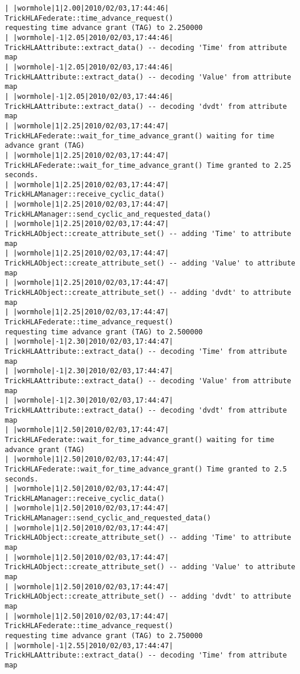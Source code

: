 \begin{lstlisting}[numbers=none,caption={output showing conditionally sent cyclic data}]
| |wormhole|1|2.00|2010/02/03,17:44:46| TrickHLAFederate::time_advance_request()   
requesting time advance grant (TAG) to 2.250000
| |wormhole|-1|2.05|2010/02/03,17:44:46| TrickHLAAttribute::extract_data() -- decoding 'Time' from attribute map
| |wormhole|-1|2.05|2010/02/03,17:44:46| TrickHLAAttribute::extract_data() -- decoding 'Value' from attribute map
| |wormhole|-1|2.05|2010/02/03,17:44:46| TrickHLAAttribute::extract_data() -- decoding 'dvdt' from attribute map
| |wormhole|1|2.25|2010/02/03,17:44:47| TrickHLAFederate::wait_for_time_advance_grant() waiting for time advance grant (TAG)
| |wormhole|1|2.25|2010/02/03,17:44:47| TrickHLAFederate::wait_for_time_advance_grant() Time granted to 2.25 seconds.
| |wormhole|1|2.25|2010/02/03,17:44:47| TrickHLAManager::receive_cyclic_data()
| |wormhole|1|2.25|2010/02/03,17:44:47| TrickHLAManager::send_cyclic_and_requested_data()
| |wormhole|1|2.25|2010/02/03,17:44:47| TrickHLAObject::create_attribute_set() -- adding 'Time' to attribute map
| |wormhole|1|2.25|2010/02/03,17:44:47| TrickHLAObject::create_attribute_set() -- adding 'Value' to attribute map
| |wormhole|1|2.25|2010/02/03,17:44:47| TrickHLAObject::create_attribute_set() -- adding 'dvdt' to attribute map
| |wormhole|1|2.25|2010/02/03,17:44:47| TrickHLAFederate::time_advance_request()   
requesting time advance grant (TAG) to 2.500000
| |wormhole|-1|2.30|2010/02/03,17:44:47| TrickHLAAttribute::extract_data() -- decoding 'Time' from attribute map
| |wormhole|-1|2.30|2010/02/03,17:44:47| TrickHLAAttribute::extract_data() -- decoding 'Value' from attribute map
| |wormhole|-1|2.30|2010/02/03,17:44:47| TrickHLAAttribute::extract_data() -- decoding 'dvdt' from attribute map
| |wormhole|1|2.50|2010/02/03,17:44:47| TrickHLAFederate::wait_for_time_advance_grant() waiting for time advance grant (TAG)
| |wormhole|1|2.50|2010/02/03,17:44:47| TrickHLAFederate::wait_for_time_advance_grant() Time granted to 2.5 seconds.
| |wormhole|1|2.50|2010/02/03,17:44:47| TrickHLAManager::receive_cyclic_data()
| |wormhole|1|2.50|2010/02/03,17:44:47| TrickHLAManager::send_cyclic_and_requested_data()
| |wormhole|1|2.50|2010/02/03,17:44:47| TrickHLAObject::create_attribute_set() -- adding 'Time' to attribute map
| |wormhole|1|2.50|2010/02/03,17:44:47| TrickHLAObject::create_attribute_set() -- adding 'Value' to attribute map
| |wormhole|1|2.50|2010/02/03,17:44:47| TrickHLAObject::create_attribute_set() -- adding 'dvdt' to attribute map
| |wormhole|1|2.50|2010/02/03,17:44:47| TrickHLAFederate::time_advance_request()   
requesting time advance grant (TAG) to 2.750000
| |wormhole|-1|2.55|2010/02/03,17:44:47| TrickHLAAttribute::extract_data() -- decoding 'Time' from attribute map

\end{lstlisting}
